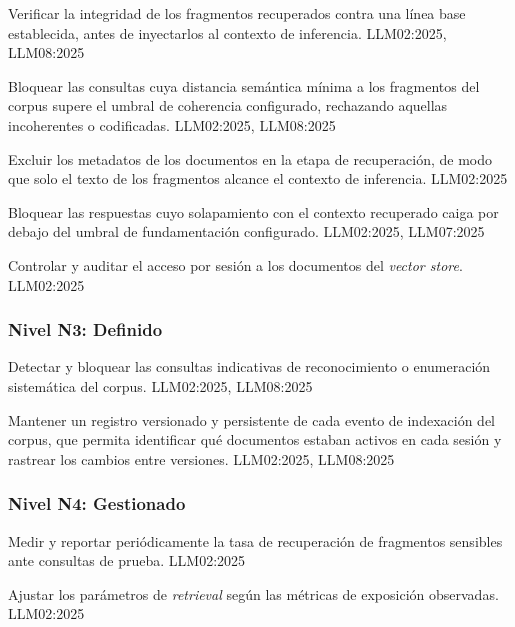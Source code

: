  {Verificar la integridad de los fragmentos recuperados contra una línea base establecida, antes de inyectarlos al contexto de inferencia.}
  {LLM02:2025, LLM08:2025}

  {Bloquear las consultas cuya distancia semántica mínima a los fragmentos del corpus supere el umbral de coherencia configurado, rechazando aquellas incoherentes o codificadas.}
  {LLM02:2025, LLM08:2025}

  {Excluir los metadatos de los documentos en la etapa de recuperación, de modo que solo el texto de los fragmentos alcance el contexto de inferencia.}
  {LLM02:2025}

  {Bloquear las respuestas cuyo solapamiento con el contexto recuperado caiga por debajo del umbral de fundamentación configurado.}
  {LLM02:2025, LLM07:2025}

  {Controlar y auditar el acceso por sesión a los documentos del \textit{vector store}.}
  {LLM02:2025}

\subsubsection*{Nivel N3: Definido}

  {Detectar y bloquear las consultas indicativas de reconocimiento o enumeración sistemática del corpus.}
  {LLM02:2025, LLM08:2025}

  {Mantener un registro versionado y persistente de cada evento de indexación del corpus, que permita identificar qué documentos estaban activos en cada sesión y rastrear los cambios entre versiones.}
  {LLM02:2025, LLM08:2025}

\subsubsection*{Nivel N4: Gestionado}

  {Medir y reportar periódicamente la tasa de recuperación de fragmentos sensibles ante consultas de prueba.}
  {LLM02:2025}

  {Ajustar los parámetros de \textit{retrieval} según las métricas de exposición observadas.}
  {LLM02:2025}


